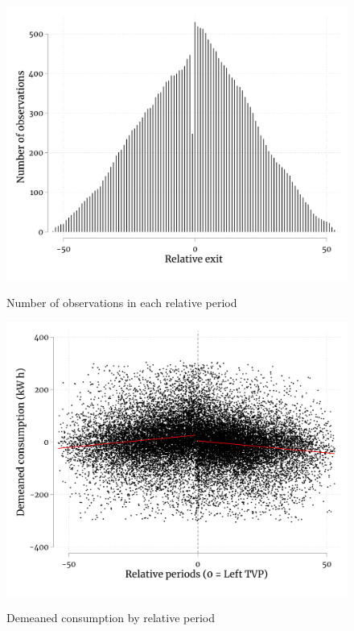 \FloatBarrier

\begin{figure}[ht]
  \caption{Number of observations in each relative period}\label{fig:fourteen}
  \begin{center}
  {\includegraphics[width=1\textwidth]{./figures/inOutNPeriods.png}}
  \end{center}
\end{figure}


\FloatBarrier

\begin{figure}[ht]
  \caption{Demeaned consumption by relative period}\label{fig:fifteen}
  \begin{center}
  {\includegraphics[width=1\textwidth]{./figures/inOutScatter.png}}
  \end{center}
\end{figure}

\FloatBarrier
